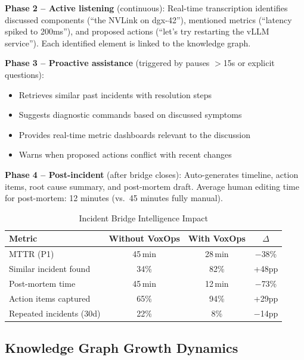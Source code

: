 \documentclass[conference,10pt]{IEEEtran}
\begin{document}
\textbf{Phase 2 -- Active listening} (continuous): Real-time transcription identifies discussed components (``the NVLink on dgx-42''), mentioned metrics (``latency spiked to 200ms''), and proposed actions (``let's try restarting the vLLM service''). Each identified element is linked to the knowledge graph.

\textbf{Phase 3 -- Proactive assistance} (triggered by pauses $>$15s or explicit questions):
\begin{itemize}
\item Retrieves similar past incidents with resolution steps
\item Suggests diagnostic commands based on discussed symptoms
\item Provides real-time metric dashboards relevant to the discussion
\item Warns when proposed actions conflict with recent changes
\end{itemize}

\textbf{Phase 4 -- Post-incident} (after bridge closes): Auto-generates timeline, action items, root cause summary, and post-mortem draft. Average human editing time for post-mortem: 12 minutes (vs.\ 45 minutes fully manual).

\begin{table}[!htbp]
\caption{Incident Bridge Intelligence Impact}
\label{tab:bridge}
\centering\scriptsize
\begin{tabular}{@{}lccc@{}}
\toprule
\textbf{Metric} & \textbf{Without VoxOps} & \textbf{With VoxOps} & \textbf{$\Delta$} \\
\midrule
MTTR (P1) & 45\,min & 28\,min & $-$38\% \\
Similar incident found & 34\% & 82\% & +48pp \\
Post-mortem time & 45\,min & 12\,min & $-$73\% \\
Action items captured & 65\% & 94\% & +29pp \\
Repeated incidents (30d) & 22\% & 8\% & $-$14pp \\
\bottomrule
\end{tabular}
\end{table}

\subsection{Knowledge Graph Growth Dynamics}
\end{document}

